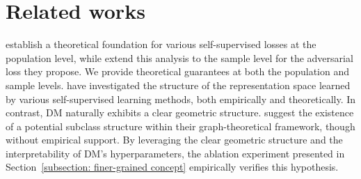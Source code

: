 \section{Related works}
\label{subsection: related works}
\citet{huang2023towards} establish a theoretical foundation for various self-supervised losses at the population level, while \citet{duan2024unsupervisedtransferlearningadversarial} extend this analysis to the sample level for the adversarial loss they propose. We provide theoretical guarantees at both the population and sample levels. \citet{wang2020understanding, Awasthi2022DoMN, huang2023towards, duan2024unsupervisedtransferlearningadversarial} have investigated the structure of the representation space learned by various self-supervised learning methods, both empirically and theoretically. In contrast, DM naturally exhibits a clear geometric structure. \citet{haochen2021spectral, haochen2022beyond, haochen2023theoretical} suggest the existence of a potential subclass structure within their graph-theoretical framework, though without empirical support. By leveraging the clear geometric structure and the interpretability of DM's hyperparameters, the ablation experiment presented in Section~\ref{subsection: finer-grained concept} empirically verifies this hypothesis.